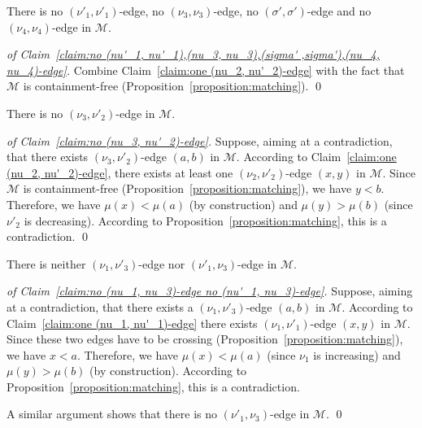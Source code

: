 \documentclass[a4paper,10pt]{llncs}
\begin{document}
\begin{claim}
  \label{claim:no (nu'_1, nu'_1),(nu_3, nu_3),(sigma' ,sigma'),(nu_4, nu_4)-edge}
  There is
  no $(\nu'_1, \nu'_1)$-edge,
  no $(\nu_3, \nu_3)$-edge,
  no $(\sigma', \sigma')$-edge and
  no $(\nu_4, \nu_4)$-edge
  in $\mathcal{M}$.
\end{claim}

\begin{proof}[of Claim~\ref{claim:no (nu'_1, nu'_1),(nu_3, nu_3),(sigma' ,sigma'),(nu_4, nu_4)-edge}]
  Combine Claim~\ref{claim:one (nu_2, nu'_2)-edge} with the fact that
  $\mathcal{M}$ is containment-free (Proposition~\ref{proposition:matching}).
  \qed
\end{proof}

\begin{claim}
  \label{claim:no (nu_3, nu'_2)-edge}
  There is no $(\nu_3, \nu'_2)$-edge in $\mathcal{M}$.
\end{claim}

\begin{proof}[of Claim~\ref{claim:no (nu_3, nu'_2)-edge}]
  Suppose, aiming at a contradiction, that there exists
  $(\nu_3, \nu'_2)$-edge $(a, b)$ in $\mathcal{M}$.
  According to Claim~\ref{claim:one (nu_2, nu'_2)-edge}, there
  exists at least one $(\nu_2, \nu'_2)$-edge $(x, y)$ in $\mathcal{M}$.
  Since $\mathcal{M}$ is containment-free (Proposition~\ref{proposition:matching}),
  we have $y < b$.
  Therefore,
  we have $\mu(x) < \mu(a)$ (by construction) and
  $\mu(y) > \mu(b)$ (since $\nu'_2$ is decreasing).
  According to Proposition~\ref{proposition:matching}, this is
  a contradiction.
  \qed
\end{proof}

\begin{claim}
  \label{claim:no (nu_1, nu_3)-edge no (nu'_1, nu_3)-edge}
  There is neither $(\nu_1, \nu'_3)$-edge nor $(\nu'_1, \nu_3)$-edge
  in $\mathcal{M}$.
\end{claim}

\begin{proof}[of Claim~\ref{claim:no (nu_1, nu_3)-edge no (nu'_1, nu_3)-edge}]
  Suppose, aiming at a contradiction, that there exists a
  $(\nu_1, \nu'_3)$-edge $(a, b)$ in $\mathcal{M}$.
  According to Claim~\ref{claim:one (nu_1, nu'_1)-edge} there exists
  $(\nu_1, \nu'_1)$-edge $(x, y)$ in $\mathcal{M}$.
  Since these two edges have to be crossing
  (Proposition~\ref{proposition:matching}), we have $x < a$.
  Therefore, we have
  $\mu(x) < \mu(a)$ (since $\nu_1$ is increasing)
  and
  $\mu(y) > \mu(b)$ (by construction).
  According to Proposition~\ref{proposition:matching}, this is
  a contradiction.

  A similar argument shows that there is no
  $(\nu'_1, \nu_3)$-edge in $\mathcal{M}$.
  \qed
\end{proof}
\end{document}
